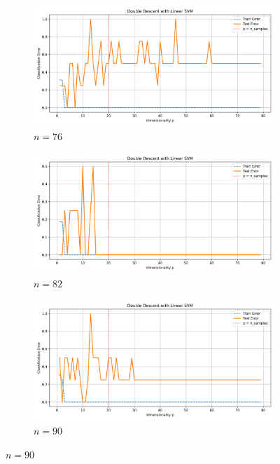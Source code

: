 \documentclass[twoside,10pt]{article}
\begin{document}
\begin{figure}[htb]
  \begin{subfigure}[b]{\imgwidth}
    \includegraphics[width=\linewidth]{img_qq/risk_curve_n40.png}
    \caption{$n=76$}\label{fig:2e1}
  \end{subfigure}%
  \hfill
  \begin{subfigure}[b]{\imgwidth}
    \includegraphics[width=\linewidth]{img_qq/risk_curve_n50.png}
    \caption{$n=82$}\label{fig:2f1}
  \end{subfigure}%
  \hfill
  \begin{subfigure}[b]{\imgwidth}
    \includegraphics[width=\linewidth]{img_qq/risk_curve_n60.png}
    \caption{$n=90$}\label{fig:2g1}

\end{subfigure}
\end{figure}
\end{document}
